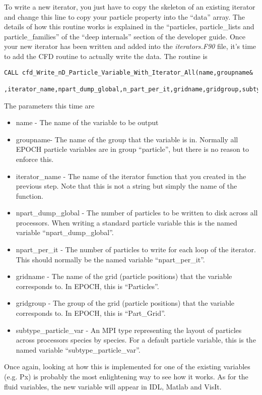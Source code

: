 \documentclass[12pt]{article}
\newcommand{\simpleboxverbatim}{\begin{Verbatim}[obeytabs=true,frame=single,
  framerule=0.5mm,rulecolor=\color{warwickmid}]}
\newcommand{\EPOCH}{{\color{warwickdark}\fontfamily{phv}\selectfont EPOCH} }
\begin{document}
To write a new iterator, you just have to copy the skeleton of an existing
iterator and change this line to copy your particle property into the ``data''
array. The details of how this routine works is explained in the ``particles,
particle\_lists and particle\_families'' of the ``deep internals'' section of
the developer guide. Once your new iterator has been written and added into the
{\it iterators.F90} file, it's time to add the CFD routine to actually write
the data. The routine is
\simpleboxverbatim
CALL cfd_Write_nD_Particle_Variable_With_Iterator_All(name,groupname&
            ,iterator_name,npart_dump_global,n_part_per_it,gridname,gridgroup,subtype_particle_var)
\end{Verbatim}

The parameters this time are
\begin{itemize}
\item name - The name of the variable to be output
\item groupname- The name of the group that the variable is in. Normally all
  \EPOCH particle variables are in group ``particle'', but there is no reason
  to enforce this.
\item iterator\_name - The name of the iterator function that you created in
  the previous step. Note that this is not a string but simply the name of the
  function.
\item npart\_dump\_global - The number of particles to be written to disk
  across all processors. When writing a standard particle variable this is the
  named variable ``npart\_dump\_global''.
\item npart\_per\_it - The number of particles to write for each loop of the
  iterator. This should normally be the named variable ``npart\_per\_it''.
\item gridname - The name of the grid (particle positions) that the variable
  corresponds to. In EPOCH, this is ``Particles''.
\item gridgroup - The group of the grid (particle positions) that the variable
  corresponds to. In EPOCH, this is ``Part\_Grid''.
\item subtype\_particle\_var - An MPI type representing the layout of particles
  across processors species by species. For a default particle variable, this
  is the named variable ``subtype\_particle\_var''.
\end{itemize}

Once again, looking at how this is implemented for one of the existing
variables (e.g. Px) is probably the most enlightening way to see how it
works. As for the fluid variables, the new variable will appear in IDL, Matlab
and VisIt.
\end{document}
